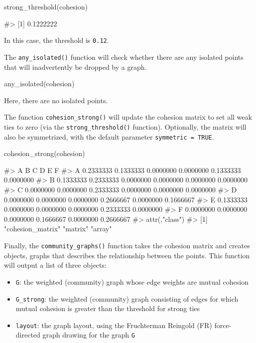 \begin{Schunk}
\begin{Sinput}
strong_threshold(cohesion)
\end{Sinput}
\begin{Soutput}
#> [1] 0.1222222
\end{Soutput}
\end{Schunk}

In this case, the threshold is \texttt{0.12}.

The \texttt{any\_isolated()} function will check whether there are any
isolated points that will inadvertently be dropped by a graph.

\begin{Schunk}
\begin{Sinput}
any_isolated(cohesion)
\end{Sinput}
\end{Schunk}

Here, there are no isolated points.

The function \texttt{cohesion\_strong()} will update the cohesion matrix
to set all weak ties to zero (via the \texttt{strong\_threshold()}
function). Optionally, the matrix will also be symmetrized, with the
default parameter \texttt{symmetric\ =\ TRUE}.

\begin{Schunk}
\begin{Sinput}
cohesion_strong(cohesion)
\end{Sinput}
\begin{Soutput}
#>           A         B         C         D         E         F
#> A 0.2333333 0.1333333 0.0000000 0.0000000 0.1333333 0.0000000
#> B 0.1333333 0.2333333 0.0000000 0.0000000 0.0000000 0.0000000
#> C 0.0000000 0.0000000 0.2333333 0.0000000 0.0000000 0.0000000
#> D 0.0000000 0.0000000 0.0000000 0.2666667 0.0000000 0.1666667
#> E 0.1333333 0.0000000 0.0000000 0.0000000 0.2333333 0.0000000
#> F 0.0000000 0.0000000 0.0000000 0.1666667 0.0000000 0.2666667
#> attr(,"class")
#> [1] "cohesion_matrix" "matrix"          "array"
\end{Soutput}
\end{Schunk}

Finally, the \texttt{community\_graphs()} function takes the cohesion
matrix and creates  objects, graphs that describes the
relationship between the points. This function will output a list of
three objects:

\begin{itemize}
\tightlist
\item
  \texttt{G}: the weighted (community) graph whose edge weights are
  mutual cohesion
\item
  \texttt{G\_strong}: the weighted (community) graph consisting of edges
  for which mutual cohesion is greater than the threshold for strong
  ties
\item
  \texttt{layout}: the graph layout, using the Fruchterman Reingold (FR)
  force-directed graph drawing for the graph \texttt{G}
\end{itemize}

